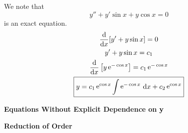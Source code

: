 {%
\begin{Solution}
  \label{solution y+ysinx+ycosx}
  We note that
  \[ 
  y'' + y' \sin x + y \cos x = 0 
  \]
  is an exact equation.
  \begin{gather*}
    \frac{\mathrm{d}}{\mathrm{d} x} [ y' + y \sin x] = 0 \\
    y' + y \sin x = c_1 \\
    \frac{\mathrm{d}}{\mathrm{d} x} \left[ y \mathop{\mathrm{e}}\nolimits^{-\cos x} \right] = c_1 \mathop{\mathrm{e}}\nolimits^{-\cos x} \\
    \boxed{ 
      y = c_1 \mathop{\mathrm{e}}\nolimits^{\cos x} \int \mathop{\mathrm{e}}\nolimits^{-\cos x}\,\mathrm{d} x + c_2 \mathop{\mathrm{e}}\nolimits^{\cos x} 
      }
  \end{gather*}
\end{Solution}



\begin{large}
  \noindent
  \textbf{Equations Without Explicit Dependence on \protect$ \mathbf{y} \protect$}
\end{large}

\begin{large}
  \noindent
  \textbf{Reduction of Order}
\end{large}





}
